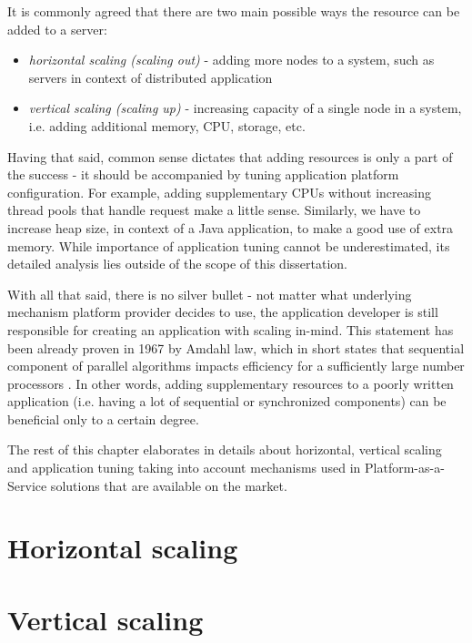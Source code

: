 It is commonly agreed that there are two main possible ways the resource can be added to a server:
\begin{itemize}
	\item \textit{horizontal scaling (scaling out)} - adding more nodes to a system, such as servers in context of distributed application
	\item \textit{vertical scaling (scaling up)} - increasing capacity of a single node in a system, i.e. adding additional memory, CPU, storage, etc.
\end{itemize}

Having that said, common sense dictates that adding resources is only a part of the success - it should be accompanied by tuning application platform configuration. For example, adding supplementary CPUs without increasing thread pools that handle request make a little sense. Similarly, we have to increase heap size, in context of a Java application, to make a good use of extra memory. While importance of application tuning cannot be underestimated, its detailed analysis lies outside of the scope of this dissertation.

With all that said, there is no silver bullet - not matter what underlying mechanism platform provider decides to use, the application developer is still responsible for creating an application with scaling in-mind. This statement has been already proven in 1967 by Amdahl law, which in short states that sequential component of parallel algorithms impacts efficiency for a sufficiently large number processors \cite{Am67}. In other words, adding supplementary resources to a poorly written application (i.e. having a lot of sequential or synchronized components) can be beneficial only to a certain degree.

The rest of this chapter elaborates in details about horizontal, vertical scaling and application tuning taking into account mechanisms used in Platform-as-a-Service solutions that are available on the market.

\section{Horizontal scaling}

\section{Vertical scaling}

